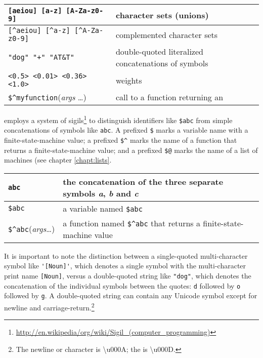 \vspace{0.5cm}

\noindent
\begin{tabular}{|l|p{7.2cm}|}
\hline
\verb![aeiou] [a-z] [A-Za-z0-9]! & character sets (unions)\\
\hline
\verb![^aeiou] [^a-z] [^A-Za-z0-9]! & complemented character sets\\
\hline
\verb!"dog" "+" "AT&T"! & double-quoted literalized concatenations of symbols\\
\hline
\verb!<0.5> <0.01> <0.36> <1.0>! &  weights\\
\hline
\verb!$^myfunction!(\textit{args} \ldots) & call to a function returning
an \fsm{}\\
\hline
\end{tabular}

\vspace{0.5cm}

\Kleene{} employs a system of
sigils\footnote{\url{http://en.wikipedia/org/wiki/Sigil_(computer_programming)}}
to distinguish identifiers like \verb!$abc! from simple concatenations of symbols 
like \verb!abc!.  A prefixed
\verb!$! marks a variable name with a finite-state-machine value; a prefixed
\verb!$^! marks the
name of a function that returns a finite-state-machine value; and a prefixed \verb!$@! marks the name of
a list of machines (see chapter \ref{chapt:lists}.

\vspace{0.5cm} 

\begin{center}
\begin{tabular}{|l|p{8cm}|}
\hline
\verb!abc! & the concatenation of the three separate symbols \emph{a}, \emph{b} and \emph{c} \\
\hline
\verb!$abc! & a variable named \verb!$abc! \\
\hline
\verb!$^abc!(\textit{args}\ldots{}) & a function named
\verb!$^abc! that returns a finite-state-machine value\\
\hline
\end{tabular}
\end{center}

\vspace{0.5cm}

It is important to note the distinction between a single-quoted
multi-character symbol like \verb!'[Noun]'!, which denotes a single
symbol with the multi-character print name \verb![Noun]!, versus a
double-quoted string like \verb!"dog"!, which denotes the concatenation of
the individual symbols between the quotes: \texttt{d} followed by \texttt{o} followed by
\texttt{g}.  A double-quoted string can
contain any Unicode  symbol except for newline and
carriage-return.\footnote{The newline or  character is
\textbackslash{}u000A; the  is
\textbackslash{}u000D.}

